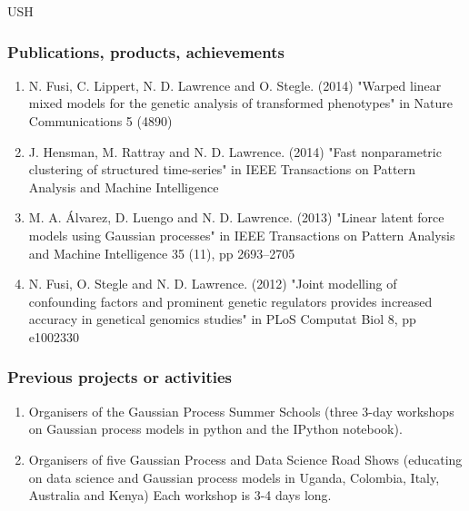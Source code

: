 \begin{sitedescription}{USH}
%

\subsubsection*{Publications, products, achievements}

\begin{enumerate}
\item N. Fusi, C. Lippert, N. D. Lawrence and O. Stegle. (2014) "Warped linear mixed models for the genetic analysis of transformed phenotypes" in Nature Communications 5 (4890)
\item J. Hensman, M. Rattray and N. D. Lawrence. (2014) "Fast nonparametric clustering of structured time-series" in IEEE Transactions on Pattern Analysis and Machine Intelligence
\item M. A. \'Alvarez, D. Luengo and N. D. Lawrence. (2013) "Linear latent force models using Gaussian processes" in IEEE Transactions on Pattern Analysis and Machine Intelligence 35 (11), pp 2693--2705
\item N. Fusi, O. Stegle and N. D. Lawrence. (2012) "Joint modelling of confounding factors and prominent genetic regulators provides increased accuracy in genetical genomics studies" in PLoS Computat Biol 8, pp e1002330
\end{enumerate}

\subsubsection*{Previous projects or activities}

\begin{enumerate}
\item Organisers of the Gaussian Process Summer Schools (three 3-day workshops on Gaussian process models in python and the IPython notebook).
\item Organisers of five Gaussian Process and Data Science Road Shows (educating on data science and Gaussian process models in Uganda, Colombia, Italy, Australia and Kenya) Each workshop is 3-4 days long. 
\end{enumerate}


\end{sitedescription}

